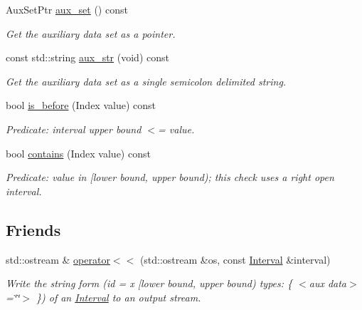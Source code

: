 \begin{DoxyCompactItemize}
Aux\+Set\+Ptr \hyperlink{classgeo__data_1_1Interval_a929e1e46a0c0ad5ab22627ce6166f09a}{aux\+\_\+set} () const 
\begin{DoxyCompactList}\small\item\em Get the auxiliary data set as a pointer. \end{DoxyCompactList}\item 
const std\+::string \hyperlink{classgeo__data_1_1Interval_a2e87ef8f764694e616244a6e9fd1d2a1}{aux\+\_\+str} (void) const 
\begin{DoxyCompactList}\small\item\em Get the auxiliary data set as a single semicolon delimited string. \end{DoxyCompactList}\item 
bool \hyperlink{classgeo__data_1_1Interval_a30406828bf5a2cc80a345b0a6a7356c6}{is\+\_\+before} (Index value) const 
\begin{DoxyCompactList}\small\item\em Predicate\+: interval upper bound $<$= value. \end{DoxyCompactList}\item 
bool \hyperlink{classgeo__data_1_1Interval_a64cd0e0eb27d67f9cfaf3d5355416892}{contains} (Index value) const 
\begin{DoxyCompactList}\small\item\em Predicate\+: value in \mbox{[}lower bound, upper bound); this check uses a right open interval. \end{DoxyCompactList}\end{DoxyCompactItemize}
\subsection*{Friends}
\begin{DoxyCompactItemize}
\item 
std\+::ostream \& \hyperlink{classgeo__data_1_1Interval_ac95b512584f3f7b577829ab5f2331c0f}{operator$<$$<$} (std\+::ostream \&os, const \hyperlink{classgeo__data_1_1Interval}{Interval} \&interval)
\begin{DoxyCompactList}\small\item\em Write the string form (id = x \mbox{[}lower bound, upper bound) types\+: \{ $<$aux data$>$=\char`\"{}\char`\"{}$>$ \}) of an \hyperlink{classgeo__data_1_1Interval}{Interval} to an output stream. \end{DoxyCompactList}\end{DoxyCompactItemize}


